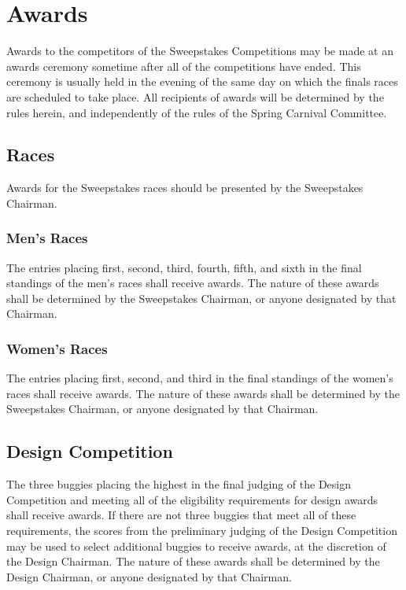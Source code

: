 \chapter{Awards}

	Awards to the competitors of the Sweepstakes Competitions may be made at an
	awards ceremony sometime after all of the competitions have ended. This 
	ceremony is usually held in the evening of the same day on which the finals
	races are scheduled to take place. All recipients of awards will be 
	determined by the rules herein, and independently of the rules of the Spring
	Carnival Committee.

\section{Races}

	Awards for the Sweepstakes races should be presented by the Sweepstakes
	Chairman.

\subsection{Men's Races}

	The entries placing first, second, third, fourth, fifth, and sixth in the 
	final standings of the men's races shall receive awards. The nature of 
	these awards shall be determined by the Sweepstakes Chairman, or anyone 
	designated by that Chairman.

\subsection{Women's Races}

	The entries placing first, second, and third in the final standings of the 
	women's races shall receive awards. The nature of these awards shall be 
	determined by the Sweepstakes Chairman, or anyone designated by that Chairman.

\section{Design Competition}

	The three buggies placing the highest in the final judging of the Design 
	Competition and meeting all of the eligibility requirements for design 
	awards shall receive awards. If there are not three buggies that meet all 
	of these requirements, the scores from the preliminary judging of the Design
	Competition may be used to select additional buggies to receive awards, at 
	the discretion of the Design Chairman. The nature of these awards shall be 
	determined by the Design Chairman, or anyone designated by that Chairman.

